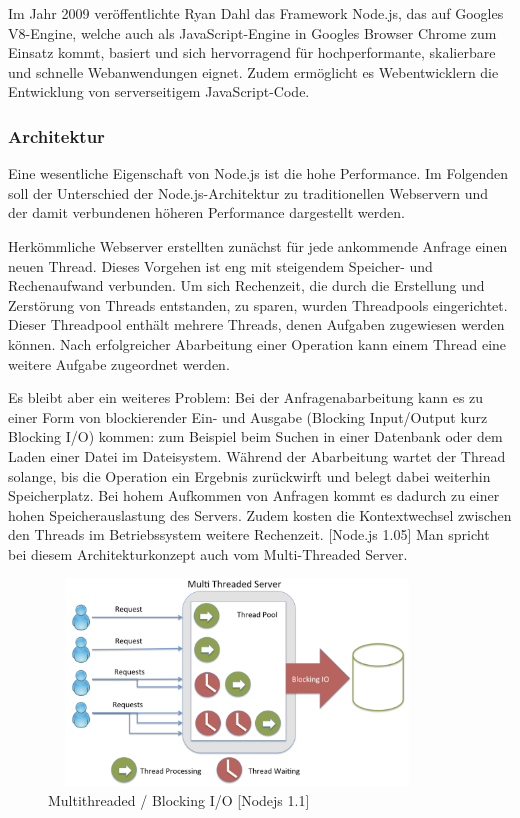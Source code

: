 Im Jahr 2009 veröffentlichte Ryan Dahl das Framework Node.js, das auf Googles V8-Engine, welche auch als JavaScript-Engine in Googles Browser Chrome zum Einsatz kommt, basiert und sich hervorragend für hochperformante, skalierbare und schnelle Webanwendungen eignet. Zudem ermöglicht es Webentwicklern die Entwicklung von serverseitigem JavaScript-Code. \-[NodeJS 1.0]


\subsubsection{Architektur}
Eine wesentliche Eigenschaft von Node.js ist die hohe Performance. Im Folgenden soll der Unterschied der Node.js-Architektur zu traditionellen Webservern und der damit verbundenen höheren Performance dargestellt werden.
\newline

Herkömmliche Webserver erstellten zunächst für jede ankommende Anfrage einen neuen Thread. Dieses Vorgehen ist eng mit steigendem Speicher- und Rechenaufwand verbunden. Um sich Rechenzeit, die durch die Erstellung und Zerstörung von Threads entstanden, zu sparen, wurden Threadpools eingerichtet. Dieser Threadpool enthält mehrere Threads, denen Aufgaben zugewiesen werden können. Nach erfolgreicher Abarbeitung einer Operation kann einem Thread eine weitere Aufgabe zugeordnet werden.
\newline

Es bleibt aber ein weiteres Problem: Bei der Anfragenabarbeitung kann es zu einer Form von blockierender Ein- und Ausgabe (Blocking Input/Output kurz Blocking I/O) kommen: zum Beispiel beim Suchen in einer Datenbank oder dem Laden einer Datei im Dateisystem.
 Während der Abarbeitung wartet der Thread solange, bis die Operation ein Ergebnis zurückwirft und belegt dabei weiterhin Speicherplatz. 
 Bei hohem Aufkommen von Anfragen kommt es dadurch zu einer hohen Speicherauslastung des Servers. Zudem kosten die Kontextwechsel zwischen den Threads im Betriebssystem weitere Rechenzeit. [Node.js 1.05] Man spricht bei diesem Architekturkonzept auch vom Multi-Threaded Server.
\newline

\begin{figure}[h]
\centering
\includegraphics[width=10cm, height = 5.5cm]{images/nodejs_otherthreading.png}
\caption{Multithreaded / Blocking I/O [Nodejs 1.1]}
\end{figure}
 
